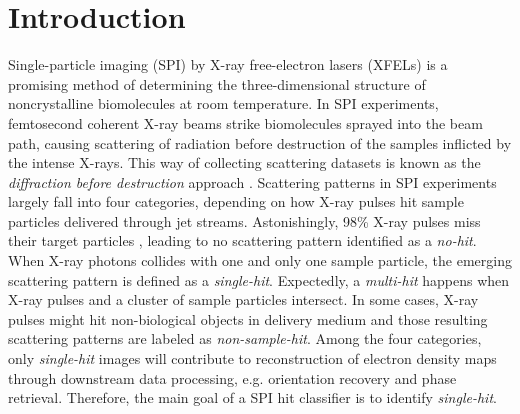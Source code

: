 




















\section{Introduction}


Single-particle imaging (SPI) by X-ray free-electron lasers (XFELs) is a
promising method of determining the three-dimensional structure of
noncrystalline biomolecules at room temperature.  In SPI experiments,
femtosecond coherent X-ray beams strike biomolecules sprayed into the beam path,
causing scattering of radiation before destruction of the samples inflicted by
the intense X-rays.  This way of collecting scattering datasets is known as the
\textit{diffraction before destruction} approach
\cite{neutzePotentialBiomolecularImaging2000,
chapmanFemtosecondDiffractiveImaging2006,seibertSingleMimivirusParticles2011,
aquilaLinacCoherentLight2015,reddyCoherentSoftXray2017a}.  Scattering patterns
in SPI experiments largely fall into four categories, depending on how X-ray
pulses hit sample particles delivered through jet streams.  Astonishingly, 98\%
X-ray pulses miss their target particles
\cite{shiEvaluationPerformanceClassification2019}, leading to no scattering
pattern identified as a \textit{no-hit}.  When X-ray photons collides with one
and only one sample particle, the emerging scattering pattern is defined as a
\textit{single-hit}. Expectedly, a \textit{multi-hit} happens when X-ray pulses
and a cluster of sample particles intersect. In some cases, X-ray pulses might
hit non-biological objects in delivery medium and those resulting scattering
patterns are labeled as \textit{non-sample-hit}.  Among the four categories,
only \textit{single-hit} images will contribute to reconstruction of electron
density maps through downstream data processing, e.g. orientation recovery and
phase retrieval.  Therefore, the main goal of a SPI hit classifier is to
identify \textit{single-hit}.  



